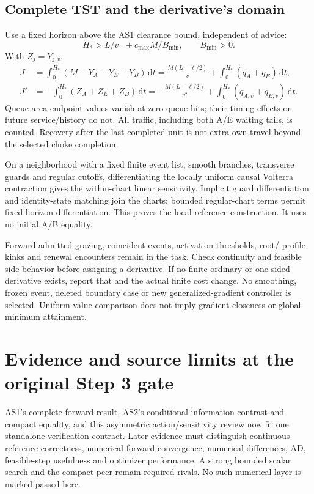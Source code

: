 \documentclass[11pt,a4paper]{article}
\newcommand{\dd}{\,\mathrm d}
\begin{document}
\subsection{Complete TST and the derivative's domain}
Use a fixed horizon above the AS1 clearance bound, independent of advice:
\[
 H_*>L/v_-+c_{\max}M/B_{\min},\qquad B_{\min}>0.
\]
With $Z_j=Y_{j,v}$,
\begin{align}
 J&=\int_0^{H_*}(M-Y_A-Y_E-Y_B)\dd t
   =\frac{M(L-\ell/2)}v+\int_0^{H_*}(q_A+q_E)\dd t,\nonumber\\
 J'&=-\int_0^{H_*}(Z_A+Z_E+Z_B)\dd t
   =-\frac{M(L-\ell/2)}{v^2}+\int_0^{H_*}(q_{A,v}+q_{E,v})\dd t.
 \label{eq:tstgradient}
\end{align}
Queue-area endpoint values vanish at zero-queue hits; their timing effects
on future service/history do not. All traffic, including both A/E waiting
tails, is counted. Recovery after the last completed unit is not extra own
travel beyond the selected choke completion.

On a neighborhood with a fixed finite event list, smooth branches, transverse
guards and regular cutoffs, differentiating the locally uniform causal
Volterra contraction gives the within-chart linear sensitivity. Implicit
guard differentiation and identity-state matching join the charts; bounded
regular-chart terms permit fixed-horizon differentiation. This proves the
local reference construction. It uses no initial A/B equality.

Forward-admitted grazing, coincident events, activation thresholds, root/
profile kinks and renewal encounters remain in the task. Check continuity
and feasible side behavior before assigning a derivative. If no finite
ordinary or one-sided derivative exists, report that and the actual finite
cost change. No smoothing, frozen event, deleted boundary case or new
generalized-gradient controller is selected. Uniform value comparison does
not imply gradient closeness or global minimum attainment.

\section{Evidence and source limits at the original Step 3 gate}
AS1's complete-forward result, AS2's conditional information contrast and
compact equality, and this asymmetric action/sensitivity review now fit one
standalone verification contract. Later evidence must distinguish continuous
reference correctness, numerical forward convergence, numerical differences,
AD, feasible-step usefulness and optimizer performance. A strong bounded
scalar search and the compact peer remain required rivals. No such numerical
layer is marked passed here.
\end{document}

